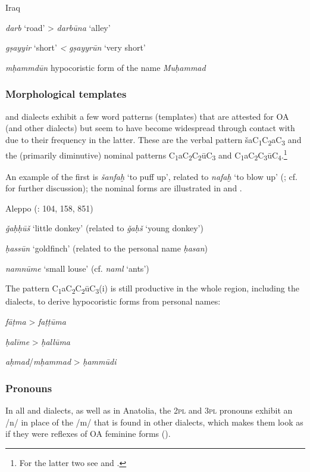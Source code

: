 \documentclass[output=paper]{langsci/langscibook}
\begin{document}
\ea\label{una}
Iraq \citep[72]{Masliyah1997}

\textit{darb} ‘road’ > \textit{darbūna} ‘alley’

\textit{gṣayyir} ‘short’ \textit{<} \textit{gṣayyrūn} ‘very short’

\textit{mḥammdūn} hypocoristic form of the name \textit{Muḥammad}
\z

\subsubsection{Morphological templates}
 and  dialects exhibit a few word patterns (templates) that are attested for OA (and other dialects) but seem to have become widespread through contact with  due to their {frequency} in the latter. These are the verbal pattern šaC\textsubscript{1}C\textsubscript{2}aC\textsubscript{3} and the (primarily {diminutive}) nominal patterns C\textsubscript{1}aC\textsubscript{2}C\textsubscript{2}ūC\textsubscript{3} and C\textsubscript{1}aC\textsubscript{2}C\textsubscript{3}ūC\textsubscript{4}.\footnote{For the latter two see \citet{Corriente1969} and \citet{Procházka2004}.}\textsubscript{} 

An example of the first is \textit{šanfaḫ} ‘to puff up’, related to \textit{nafaḫ} ‘to blow up’ (\citealt[83]{Féghali1918}; cf. \citealt[201]{Lentin2018} for further discussion); the nominal forms are illustrated in  and .

\ea\label{donkey}
Aleppo (\citealt{Barthélemy1935}: 104, 158, 851) 

\textit{ǧaḥḥūš} ‘little donkey’ (related to \textit{ǧaḥš} `young donkey')

\textit{ḥassūn} ‘goldfinch’ (related to the personal name \textit{ḥasan})

\textit{namnūme} ‘small louse’ (cf. \textit{naml} `ants')
\z

The pattern C\textsubscript{1}aC\textsubscript{2}C\textsubscript{2}ūC\textsubscript{3}(i)\textsubscript{} is still productive in the whole region, including the  dialects, to derive hypocoristic forms from personal names:

\ea\label{fatima}
\textit{fāṭma} > \textit{faṭṭūma}

\textit{ḥalīme} > \textit{ḥallūma}

\textit{aḥmad}/\textit{mḥammad} > \textit{ḥammūdi} 
\z

\subsubsection{Pronouns}
In all  and  dialects, as well as in {Anatolia}, the \textsc{2pl} and \textsc{3pl} pronouns exhibit an /n/ in place of the /m/ that is found in other  dialects, which makes them look as if they were reflexes of OA feminine forms (). 
\end{document}
